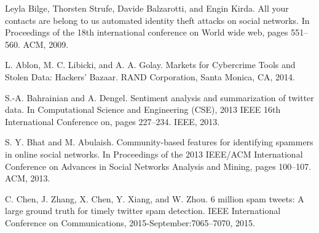 \documentclass[conference]{IEEEtran}
\begin{document}
\begin{enumerate}[label={[\arabic*]}]
\item Leyla Bilge, Thorsten Strufe, Davide Balzarotti, and
Engin Kirda. All your contacts are belong to us
automated identity theft attacks on social networks. In
Proceedings of the 18th international conference on
World wide web, pages 551–560. ACM, 2009.
\item L. Ablon, M. C. Libicki, and A. A. Golay. Markets
for Cybercrime Tools and Stolen Data: Hackers’
Bazaar. RAND Corporation, Santa Monica, CA,
2014.
\item S.-A. Bahrainian and A. Dengel. Sentiment analysis
and summarization of twitter data. In Computational
Science and Engineering (CSE), 2013 IEEE 16th
International Conference on, pages 227–234. IEEE,
2013.
\item S. Y. Bhat and M. Abulaish. Community-based
features for identifying spammers in online social
networks. In Proceedings of the 2013 IEEE/ACM
International Conference on Advances in Social Networks Analysis and Mining, pages 100–107. ACM,
2013.
\item C. Chen, J. Zhang, X. Chen, Y. Xiang, and
W. Zhou. 6 million spam tweets: A large ground
truth for timely twitter spam detection. IEEE
International Conference on Communications,
2015-September:7065–7070, 2015.

\end{enumerate}
\end{document}
